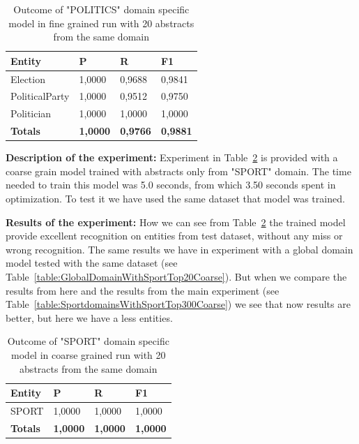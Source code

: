 \documentclass[thesis=M,english]{FITthesis}[2018/05/30]
\begin{document}
	\begin{table}[H]\centering
		\begin{tabular}{|l|l|l|l|}
			\hline {\textbf{Entity}} & {\textbf{P}} & {\textbf{R}} & {\textbf{F1}}\\\hline
				Election & 1,0000 & 0,9688 & 0,9841\\
				PoliticalParty & 1,0000 & 0,9512 & 0,9750\\
				Politician & 1,0000 & 1,0000 & 1,0000\\\hline
				\textbf{Totals} & \textbf{1,0000} & \textbf{0,9766} & \textbf{0,9881}\\\hline
		\end{tabular}
		\caption{Outcome of "POLITICS" domain specific model in fine grained run with 20 abstracts from the same domain \label{table:PoliticsDomainWithPoliticsTop20Fine}}	
	\end{table}


\textbf{Description of the experiment:} Experiment in Table~\ref{table:SportDomainWithSportTop20Coarse} is provided with a coarse grain model trained with abstracts only from "SPORT" domain. The time needed to train this model was 5.0 seconds, from which 3.50 seconds spent in optimization. To test it we have used the same dataset that model was trained.

\textbf{Results of the experiment:} How we can see from Table~\ref{table:SportDomainWithSportTop20Coarse} the trained model provide excellent recognition on entities from test dataset, without any miss or wrong recognition. The same results we have in experiment with a global domain model tested with the same dataset (see Table~\ref{table:GlobalDomainWithSportTop20Coarse}). But when we compare the results from here and the results from the main experiment (see Table~\ref{table:SportdomainsWithSportTop300Coarse}) we see that now results are better, but here we have a less entities.   
	
	\begin{table}[H]\centering
		\begin{tabular}{|l|l|l|l|}
			\hline {\textbf{Entity}} & {\textbf{P}} & {\textbf{R}} & {\textbf{F1}}\\\hline
				SPORT & 1,0000 & 1,0000 & 1,0000\\\hline
				\textbf{Totals} & \textbf{1,0000} & \textbf{1,0000} & \textbf{1,0000}\\\hline
		\end{tabular}
		\caption{Outcome of "SPORT" domain specific model in coarse grained run with 20 abstracts from the same domain \label{table:SportDomainWithSportTop20Coarse}}			
	\end{table}	
	
\end{document}
